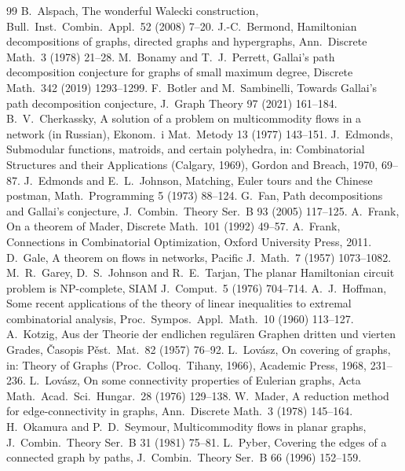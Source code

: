 \documentclass[11pt]{amsart}
\theoremstyle{definition}
\begin{document}
\begin{thebibliography}{99}
 B.~Alspach, The wonderful Walecki construction, Bull.\ Inst.\ Combin.\ Appl.\ 52
(2008) 7--20.
 J.-C.~Bermond, Hamiltonian decompositions of graphs, directed graphs and hypergraphs,
Ann.\ Discrete Math.\ 3 (1978) 21--28.
 M.~Bonamy and T.~J.~Perrett, Gallai's path decomposition conjecture for graphs of small
maximum degree, Discrete Math.\ 342 (2019) 1293--1299.
 F.~Botler and M.~Sambinelli, Towards Gallai's path decomposition conjecture, J.~Graph
Theory 97 (2021) 161--184.
 B.~V.~Cherkassky, A solution of a problem on multicommodity flows in a network (in
Russian), Ekonom.\ i Mat.\ Metody 13 (1977) 143--151.
 J.~Edmonds, Submodular functions, matroids, and certain polyhedra, in: Combinatorial
Structures and their Applications (Calgary, 1969), Gordon and Breach, 1970, 69--87.
 J.~Edmonds and E.~L.~Johnson, Matching, Euler tours and the Chinese postman, Math.\
Programming 5 (1973) 88--124.
 G.~Fan, Path decompositions and Gallai's conjecture, J.~Combin.\ Theory Ser.~B 93 (2005)
117--125.
 A.~Frank, On a theorem of Mader, Discrete Math.\ 101 (1992) 49--57.
\bibitem{FrankBook} A.~Frank, Connections in Combinatorial Optimization, Oxford University Press, 2011.
\bibitem{Gale57} D.~Gale, A theorem on flows in networks, Pacific J.\ Math.\ 7 (1957) 1073--1082.
\bibitem{GJT76} M.~R.~Garey, D.~S.~Johnson and R.~E.~Tarjan, The planar Hamiltonian circuit problem is
NP-complete, SIAM J.\ Comput.\ 5 (1976) 704--714.
 A.~J.~Hoffman, Some recent applications of the theory of linear inequalities to extremal
combinatorial analysis, Proc.\ Sympos.\ Appl.\ Math.\ 10 (1960) 113--127.
\bibitem{Kot57} A.~Kotzig, Aus der Theorie der endlichen regul\"aren Graphen dritten und vierten Grades,
\v{C}asopis P\v{e}st.\ Mat.\ 82 (1957) 76--92.
 L.~Lov\'asz, On covering of graphs, in: Theory of Graphs (Proc.\ Colloq.\ Tihany, 1966),
Academic Press, 1968, 231--236.
 L.~Lov\'asz, On some connectivity properties of Eulerian graphs, Acta Math.\ Acad.\ Sci.\
Hungar.\ 28 (1976) 129--138.
\bibitem{Mad78} W.~Mader, A reduction method for edge-connectivity in graphs, Ann.\ Discrete Math.\ 3
(1978) 145--164.
\bibitem{OS81} H.~Okamura and P.~D.~Seymour, Multicommodity flows in planar graphs, J.~Combin.\ Theory
Ser.~B 31 (1981) 75--81.
\bibitem{Pyb96} L.~Pyber, Covering the edges of a connected graph by paths, J.~Combin.\ Theory Ser.~B 66
(1996) 152--159.
\end{thebibliography}
\end{document}

